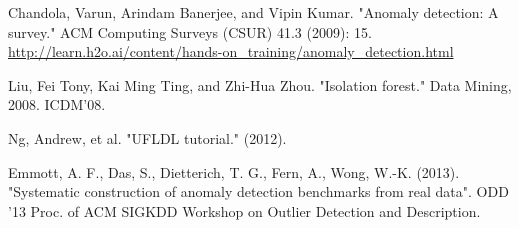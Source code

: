 \documentclass[10pt,twocolumn,letterpaper]{article}
\begin{document}
\small{
\begin{thebibliography}{1}

Chandola, Varun, Arindam Banerjee, and Vipin Kumar. "Anomaly detection: A survey." ACM Computing Surveys (CSUR) 41.3 (2009): 15.
\url{http://learn.h2o.ai/content/hands-on_training/anomaly_detection.html}

Liu, Fei Tony, Kai Ming Ting, and Zhi-Hua Zhou. "Isolation forest." Data Mining, 2008. ICDM'08. 

Ng, Andrew, et al. "UFLDL tutorial." (2012).

Emmott, A. F., Das, S., Dietterich, T. G., Fern, A., Wong, W.-K. (2013). "Systematic construction of anomaly detection benchmarks from real data". ODD '13 Proc. of ACM SIGKDD Workshop on Outlier Detection and Description.

\end{thebibliography}
}
\end{document}
